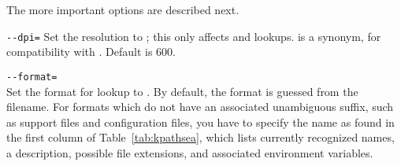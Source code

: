 \documentclass{article}
\begin{document}
The more important options are described next.

\begin{ttdescription}
\item[\texttt{-{}-dpi=\var{num}}]\mbox{} 
  Set the resolution to ; this only affects 
  and  lookups.   is a synonym, for compatibility
  with .  Default is 600.

\item[\texttt{-{}-format=\var{name}}]\mbox{}\\
  Set the format for lookup to .  By default, the
  format is guessed from the filename. For formats which do not have
  an associated unambiguous suffix, such as \MP{} support files and
   configuration files, you have to specify the name as
  found in the first column of Table~\ref{tab:kpathsea}, which lists
  currently recognized names, a description, possible file extensions, 
  and associated environment variables.
\end{ttdescription}
\end{document}
